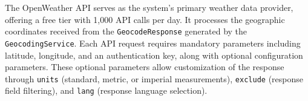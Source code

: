 The OpenWeather API serves as the system's primary weather data provider, offering a free tier with 1,000 API calls per day.
It processes the geographic coordinates received from the \texttt{GeocodeResponse} generated by the \texttt{GeocodingService}.
Each API request requires mandatory parameters including latitude, longitude, and an authentication key, along with optional configuration parameters.
These optional parameters allow customization of the response through \texttt{units} (standard, metric, or imperial measurements),
\texttt{exclude} (response field filtering), and \texttt{lang} (response language selection).
